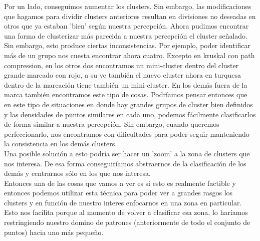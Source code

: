 \documentclass[12pt,a4paper]{article}
\begin{document}
Por un lado, conseguimos aumentar los clusters. Sin embargo, las modificaciones que hagamos para dividir clusters anteriores resultan en divisiones no deseadas en otros que ya estaban 'bien' según nuestra percepción. Ahora pudimos encontrar una forma de clusterizar más parecida a nuestra percepción el cluster señalado. Sin embargo, esto produce ciertas inconsistencias. Por ejemplo, poder identificar más de un grupo nos cuesta encontrar ahora cuatro. Excepto en kruskal con path compression, en los otros dos encontramos un mini-cluster dentro del cluster grande marcado con rojo, a su ve también el nuevo cluster ahora en turquesa dentro de la marcación tiene también un mini-cluster. En los demás fuera de la marca también encontramos este tipo de cosas. Podríamos pensar entonces que en este tipo de situaciones en donde hay grandes grupos de cluster bien definidos y las densidades de puntos similares en cada uno, podemos fácilmente clasificarlos de forma similar a nuestra percepción. Sin embargo, cuando queremos perfeccionarlo, nos encontramos con dificultades para poder seguir manteniendo la consistencia en los demás clusters. \\
Una posible solución a esto podría ser hacer un 'zoom' a la zona de clusters que nos interesa. De esa forma conseguiríamos abstraernos de la clasificación de los demás y centrarnos sólo en los que nos interesa.\\
Entonces una de las cosas que vamos a ver es si esto es realmente factible y entonces podemos utilizar esta técnica para poder ver a grandes rasgos los clusters y en función de nuestro interes enfocarnos en una zona en particular. Esto nos facilita porque al momento de volver a clasificar esa zona, lo haríamos restringiendo nuestro domino de patrones (anteriormente de todo el conjunto de puntos) hacia uno más pequeño.\\ 
\end{document}

